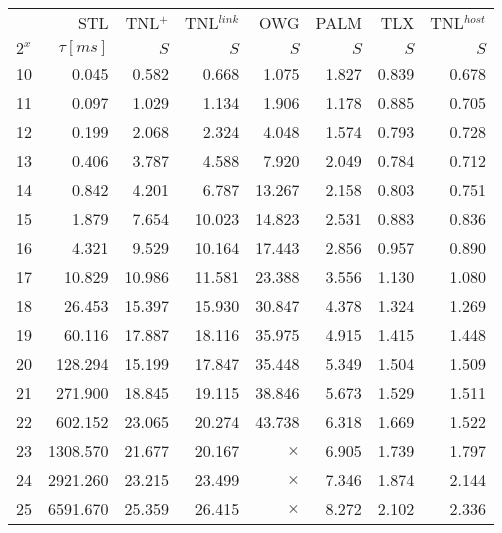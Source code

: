 
\begin{tabular}{lr|rrrrrr}
  \toprule
  {}    & STL        & TNL$^+$ & TNL$^{link}$ & OWG      & PALM  & TLX   & TNL$^{host}$ \\
  $2^x$ & $\tau[ms]$ & $S$     & $S$          & $S$      & $S$   & $S$   & $S$          \\
  \midrule
  10    & 0.045      & 0.582   & 0.668        & 1.075    & 1.827 & 0.839 & 0.678        \\
  11    & 0.097      & 1.029   & 1.134        & 1.906    & 1.178 & 0.885 & 0.705        \\
  12    & 0.199      & 2.068   & 2.324        & 4.048    & 1.574 & 0.793 & 0.728        \\
  13    & 0.406      & 3.787   & 4.588        & 7.920    & 2.049 & 0.784 & 0.712        \\
  14    & 0.842      & 4.201   & 6.787        & 13.267   & 2.158 & 0.803 & 0.751        \\
  15    & 1.879      & 7.654   & 10.023       & 14.823   & 2.531 & 0.883 & 0.836        \\
  16    & 4.321      & 9.529   & 10.164       & 17.443   & 2.856 & 0.957 & 0.890        \\
  17    & 10.829     & 10.986  & 11.581       & 23.388   & 3.556 & 1.130 & 1.080        \\
  18    & 26.453     & 15.397  & 15.930       & 30.847   & 4.378 & 1.324 & 1.269        \\
  19    & 60.116     & 17.887  & 18.116       & 35.975   & 4.915 & 1.415 & 1.448        \\
  20    & 128.294    & 15.199  & 17.847       & 35.448   & 5.349 & 1.504 & 1.509        \\
  21    & 271.900    & 18.845  & 19.115       & 38.846   & 5.673 & 1.529 & 1.511        \\
  22    & 602.152    & 23.065  & 20.274       & 43.738   & 6.318 & 1.669 & 1.522        \\
  23    & 1308.570   & 21.677  & 20.167       & $\times$ & 6.905 & 1.739 & 1.797        \\
  24    & 2921.260   & 23.215  & 23.499       & $\times$ & 7.346 & 1.874 & 2.144        \\
  25    & 6591.670   & 25.359  & 26.415       & $\times$ & 8.272 & 2.102 & 2.336        \\
  \bottomrule
\end{tabular}


